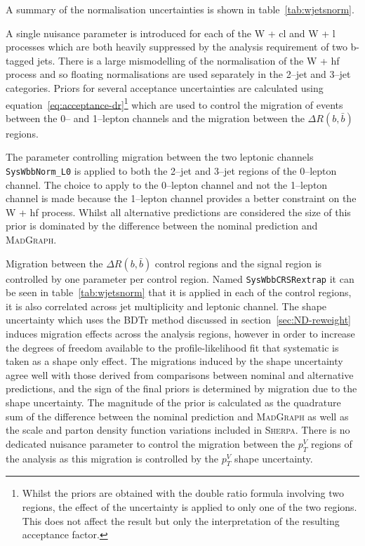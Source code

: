 A summary of the normalisation uncertainties is shown in
table~\ref{tab:wjetsnorm}.

A single nuisance parameter is introduced for each of the W + cl and W + l
processes which are both heavily suppressed by the analysis requirement of two
b-tagged jets. There is a large mismodelling of the normalisation of the W + hf
process and so floating normalisations are used separately in the 2--jet and
3--jet categories. Priors for several acceptance uncertainties are calculated using
equation~\ref{eq:acceptance-dr}\footnote{Whilst the priors are obtained with the
  double ratio formula involving two regions, the effect of the uncertainty is
  applied to only one of the two regions. This does not affect the result but
  only the interpretation of the resulting acceptance factor.} which are used to
control the migration of events between the 0-- and 1--lepton channels and the
migration between the $\Delta R(b, \bar{b})$ regions.

The parameter controlling migration between the two leptonic channels
\texttt{SysWbbNorm\_L0} is applied to both the 2--jet and 3--jet regions of the
0--lepton channel. The choice to apply to the 0--lepton channel and not the
1--lepton channel is made because the 1--lepton channel provides a better
constraint on the W + hf process. Whilst all alternative predictions are
considered the size of this prior is dominated by the difference between the
nominal prediction and \textsc{MadGraph}.

Migration between the $\Delta R(b, \bar{b})$ control regions and the signal
region is controlled by one parameter per control region. Named
\texttt{SysWbbCRSRextrap} it can be seen in table~\ref{tab:wjetsnorm} that it is
applied in each of the control regions, it is also correlated across jet
multiplicity and leptonic channel. The shape uncertainty which uses the BDTr
method discussed in section~\ref{sec:ND-reweight} induces migration effects
across the analysis regions, however in order to increase the degrees of freedom
available to the profile-likelihood fit that systematic is taken as a shape only
effect. The migrations induced by the shape uncertainty agree well with those
derived from comparisons between nominal and alternative predictions, and the
sign of the final priors is determined by migration due to the shape
uncertainty. The magnitude of the prior is calculated as the quadrature sum of
the difference between the nominal prediction and \textsc{MadGraph} as well as
the scale and parton density function variations included in \textsc{Sherpa}.
There is no dedicated nuisance parameter to control the migration between the
$p_T^V$ regions of the analysis as this migration is controlled by the $p_T^V$
shape uncertainty.

